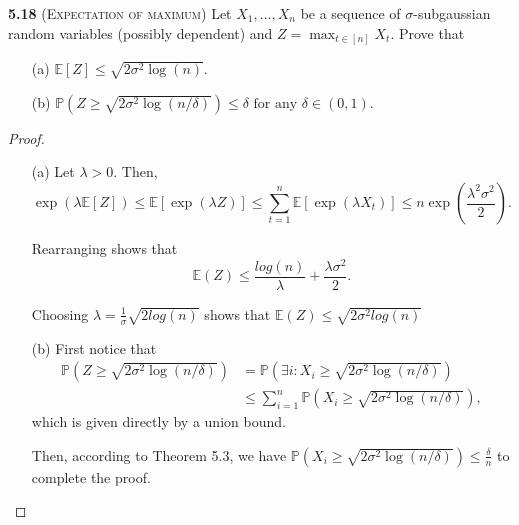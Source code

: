 \noindent \textbf{5.18} (\textsc{Expectation of maximum})
Let $X_{1}, \ldots, X_{n}$ be a sequence of $\sigma$-subgaussian random variables
(possibly dependent) and $Z=\max _{t \in[n]} X_{t}$. Prove that

\begin{itemize}
	\item[(a)] $\mathbb{E}[Z] \leq \sqrt{2 \sigma^{2} \log (n)}$.
	\item[(b)] $\mathbb{P}\left(Z \geq \sqrt{2 \sigma^{2} \log (n / \delta)}\right) \leq \delta \text { for any } \delta \in(0,1)$.
\end{itemize}

\begin{proof}
	\begin{itemize}
		\item[(a)] Let $\lambda >0$.
		Then,
		\begin{equation*}
			\exp(\lambda \mathbb{E}[Z]) \leq \mathbb{E}[\exp(\lambda Z)] \leq \sum_{t=1}^n \mathbb{E}[\exp(\lambda X_t)] \leq n \exp(\frac{\lambda^2 \sigma^2}{2}).
		\end{equation*}
		
		Rearranging shows that
		\begin{equation*}
			\mathbb{E}(Z) \leq \frac{log(n)}{\lambda} + \frac{\lambda \sigma^2}{2}.
		\end{equation*}
	
		Choosing $\lambda = \frac{1}{\sigma} \sqrt{2log(n)}$ shows that $\mathbb{E}(Z) \leq \sqrt{2\sigma^2 log(n)}$
		
		\item[(b)] First notice that
		\begin{equation*}
			\begin{aligned}
				\mathbb{P}\left(Z \geq \sqrt{2 \sigma^{2} \log (n / \delta)}\right)
				&= \mathbb{P}\left(\exists i: X_i \geq \sqrt{2 \sigma^{2} \log (n / \delta)}\right)\\
				&\leq \sum_{i=1}^n \mathbb{P}\left(X_i \geq \sqrt{2 \sigma^{2} \log (n / \delta)}\right),
			\end{aligned}
		\end{equation*} 
		which is given directly by a union bound.

		Then, according to Theorem 5.3, we have $\mathbb{P}\left(X_i \geq \sqrt{2 \sigma^{2} \log (n / \delta)}\right)
		\leq \frac{\delta}{n}$ to complete the proof.
	\end{itemize}
\end{proof}
